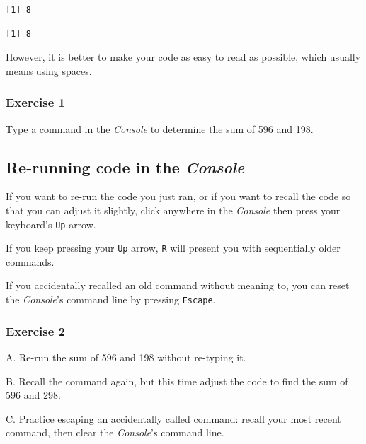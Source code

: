 \documentclass[
]{book}
\begin{document}
\begin{verbatim}
[1] 8
\end{verbatim}

\begin{verbatim}
[1] 8
\end{verbatim}

However, it is better to make your code as easy to read as possible, which usually means using spaces.

\hypertarget{exercise-1}{%
\subsubsection*{Exercise 1}\label{exercise-1}}

Type a command in the \emph{Console} to determine the sum of 596 and 198.

\hypertarget{re-running-code-in-the-console}{%
\subsection*{\texorpdfstring{Re-running code in the \emph{Console}}{Re-running code in the Console}}\label{re-running-code-in-the-console}}

If you want to re-run the code you just ran, or if you want to recall the code so that you can adjust it slightly, click anywhere in the \emph{Console} then press your keyboard's \texttt{Up} arrow.

If you keep pressing your \texttt{Up} arrow, \texttt{R} will present you with sequentially older commands.

If you accidentally recalled an old command without meaning to, you can reset the \emph{Console}'s command line by pressing \texttt{Escape}.

\hypertarget{exercise-2}{%
\subsubsection*{Exercise 2}\label{exercise-2}}

A. Re-run the sum of 596 and 198 without re-typing it.

B. Recall the command again, but this time adjust the code to find the sum of 596 and 298.

C. Practice escaping an accidentally called command: recall your most recent command, then clear the \emph{Console}'s command line.
\end{document}
